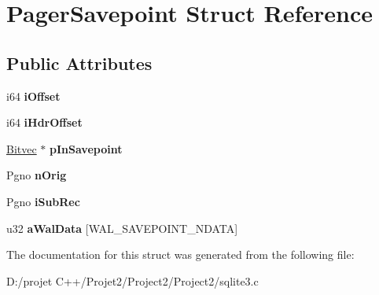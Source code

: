 \hypertarget{struct_pager_savepoint}{}\section{Pager\+Savepoint Struct Reference}
\label{struct_pager_savepoint}
\subsection*{Public Attributes}
\begin{DoxyCompactItemize}
\item 
\mbox{\label{struct_pager_savepoint_ab3ee7b75a10f47a82c8e3312bee6ad60}} 
i64 {\bfseries i\+Offset}
\item 
\mbox{\label{struct_pager_savepoint_ae1afd1cf4fba6f7efd232656366121d1}} 
i64 {\bfseries i\+Hdr\+Offset}
\item 
\mbox{\label{struct_pager_savepoint_abf7d6dc9d457c866727f84c4b9e0348f}} 
\mbox{\hyperlink{struct_bitvec}{Bitvec}} $\ast$ {\bfseries p\+In\+Savepoint}
\item 
\mbox{\label{struct_pager_savepoint_a944cca2844a51bdba253476f516b9865}} 
Pgno {\bfseries n\+Orig}
\item 
\mbox{\label{struct_pager_savepoint_ac1accce313b9da31631892e2cbe85a2f}} 
Pgno {\bfseries i\+Sub\+Rec}
\item 
\mbox{\label{struct_pager_savepoint_ac96cff844a24378c426a9901517f1d6c}} 
u32 {\bfseries a\+Wal\+Data} \mbox{[}W\+A\+L\+\_\+\+S\+A\+V\+E\+P\+O\+I\+N\+T\+\_\+\+N\+D\+A\+TA\mbox{]}
\end{DoxyCompactItemize}


The documentation for this struct was generated from the following file\+:\begin{DoxyCompactItemize}
\item 
D\+:/projet C++/\+Projet2/\+Project2/\+Project2/sqlite3.\+c\end{DoxyCompactItemize}
